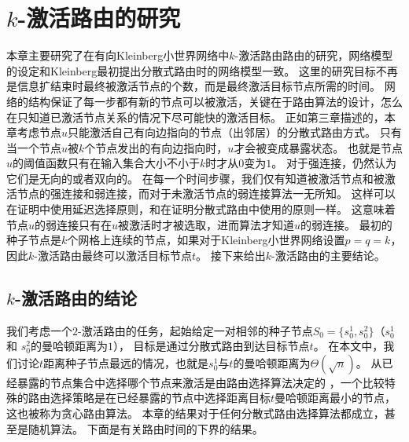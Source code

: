 \chapter{$k$-激活路由的研究}

\def \doubleto {\stackrel{ \geq 2}{\longrightarrow}}

本章主要研究了在有向Kleinberg小世界网络中$k$-激活路由路由的研究，网络模型的设定和Kleinberg最初提出分散式路由时的网络模型一致\cite{Kleinberg2000small}。
这里的研究目标不再是信息扩结束时最终被激活节点的个数，而是最终激活目标节点所需的时间。
网络的结构保证了每一步都有新的节点可以被激活，关键在于路由算法的设计，怎么在只知道已激活节点关系的情况下尽可能快的激活目标。
正如第三章描述的，本章考虑节点$u$只能激活自己有向边指向的节点（出邻居）的分散式路由方式。
只有当一个节点$u$被$k$个节点发出的有向边指向时，$u$才会被变成暴露状态。
也就是节点$u$的阈值函数只有在输入集合大小不小于$k$时才从$0$变为$1$。
对于强连接，仍然认为它们是无向的或者双向的。
在每一个时间步骤，我们仅有知道被激活节点和被激活节点的强连接和弱连接，而对于未激活节点的弱连接算法一无所知。
这样可以在证明中使用延迟选择原则\cite{Motwani1995randomized}，和\cite{Kleinberg2000small}在证明分散式路由中使用的原则一样。
这意味着节点$u$的弱连接只有在$u$被激活时才被选取，进而算法才知道$u$的弱连接。
最初的种子节点是$k$个网格上连续的节点，如果对于Kleinberg小世界网络设置$p = q = k$，因此$k$-激活路由最终可以激活目标节点$t$。
接下来给出$k$-激活路由的主要结论。

\section{$k$-激活路由的结论} \label{sec:routing}

我们考虑一个$2$-激活路由的任务，起始给定一对相邻的种子节点$S_0 = \{s_0^1, s_0^2\}$（$s_0^1$ 和 $s_0^2$的曼哈顿距离为$1$），
目标是通过分散式路由到达目标节点$t$。
在本文中，我们讨论$t$距离种子节点最远的情况，也就是$s_0^1$与$t$的曼哈顿距离为$\Theta(\sqrt{n})$。
从已经暴露的节点集合中选择哪个节点来激活是由路由选择算法决定的
，一个比较特殊的路由选择策略是在已经暴露的节点中选择距离目标$t$曼哈顿距离最小的节点，这也被称为贪心路由算法。
本章的结果对于任何分散式路由选择算法都成立，甚至是随机算法。
下面是有关路由时间的下界的结果。



